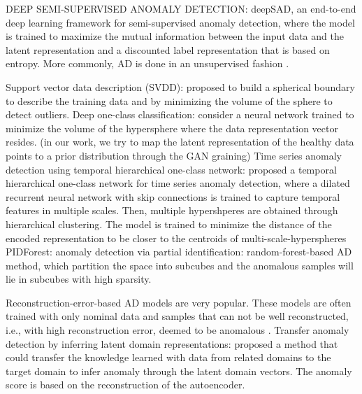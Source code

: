 \documentclass[pmlr]{jmlr}%
\begin{document}
\cite{ruff2019deep} DEEP SEMI-SUPERVISED ANOMALY DETECTION: deepSAD, an end-to-end deep learning framework for semi-supervised anomaly detection, where the model is trained to maximize the mutual information between the input data and the latent representation and a discounted label representation that is based on entropy. 
More commonly, AD is done in an unsupervised fashion \cite{references}.

\cite{tax2004support} Support vector data description (SVDD): proposed to build a spherical boundary to describe the training data and by minimizing the volume of the sphere to detect outliers.
\cite{ruff2018deep}%
Deep one-class classification: consider a neural network trained to minimize the volume of the hypersphere where the data representation vector resides. (in our work, we try to map the latent representation of the healthy data points to a prior distribution through the GAN graining)
\cite{shen2020timeseries} Time series anomaly detection using temporal hierarchical one-class network: proposed a temporal hierarchical one-class network for time series anomaly detection, where a dilated recurrent neural network with skip connections is trained to capture temporal features in multiple scales. Then, multiple hypershperes are obtained through hierarchical clustering. The model is trained to minimize the distance of the encoded representation to be closer to the centroids of multi-scale-hyperspheres
\cite{gopalan2019pidforest} PIDForest: anomaly detection via partial identification: random-forest-based AD method, which partition the space into subcubes and the anomalous samples will lie in subcubes with high sparsity.

Reconstruction-error-based AD models are very popular. These models are often trained with only nominal data and samples that can not be well reconstructed, i.e., with high reconstruction error, deemed to be anomalous \cite{kumagai2019transfer}.
\cite{kumagai2019transfer} Transfer anomaly detection by inferring latent domain representations: proposed a method that could transfer the knowledge learned with data from related domains to the target domain to infer anomaly through the latent domain vectors. The anomaly score is based on the reconstruction of the autoencoder.
\end{document}
